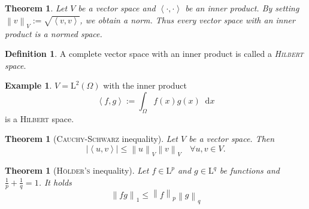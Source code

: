 \documentclass[12pt,a4paper,twoside, open=right]{scrreprt}
\theoremstyle{definition}
\newtheorem{defn}[auf]{Definition}
\newtheorem{bsp}[auf]{Example}
\theoremstyle{plain}
\newtheorem{sa}[auf]{Theorem}
\newcommand{\abs}[1]{\left\vert #1\right\vert}
\newcommand{\dotp}[2]{\left\langle #1,#2\right\rangle}
\newcommand{\norm}[1]{\left\lVert#1\right\rVert}
\newcommand{\D}{\mathop{}\!\mathrm{d}}
\begin{document}
\begin{sa}
    Let $V$ be a vector space and $\dotp{\cdot}{\cdot}$ be an inner product. By setting $\norm{v}_V:=\sqrt{\dotp{v}{v}}$, we obtain a norm. Thus every vector space with an inner product is a normed space.
\end{sa}
\begin{defn}
    A complete vector space with an inner product is called a \emph{\textsc{Hilbert} space}.
\end{defn}
\begin{bsp}
    $V=\mathrm{L}^2(\Omega)$ with the inner product
    \begin{equation}
    \dotp{f}{g}:=\int_\Omega f(x)g(x)\D x
    \end{equation}
    is a \textsc{Hilbert} space.
\end{bsp}
\begin{sa}[\textsc{Cauchy-Schwarz} inequality]
    \label{sa:Schwarz}
    Let $V$ be a vector space. Then 
    \begin{equation}
        \abs{\dotp{u}{v}}\le\norm{u}_V\norm{v}_V\quad \forall u,v\in V.
    \end{equation}
\end{sa}
\begin{sa}[\textsc{Hölder's} inequality]
    \label{sa:hoelder}
    Let $f\in \mathrm{L}^p$ and $g\in\mathrm{L}^q$ be functions and $\frac{1}{p}+\frac{1}{q}=1$. It holds
    \begin{equation}
        \norm{fg}_{1}\le\norm{f}_p\norm{g}_q
    \end{equation}
\end{sa}
\end{document}
